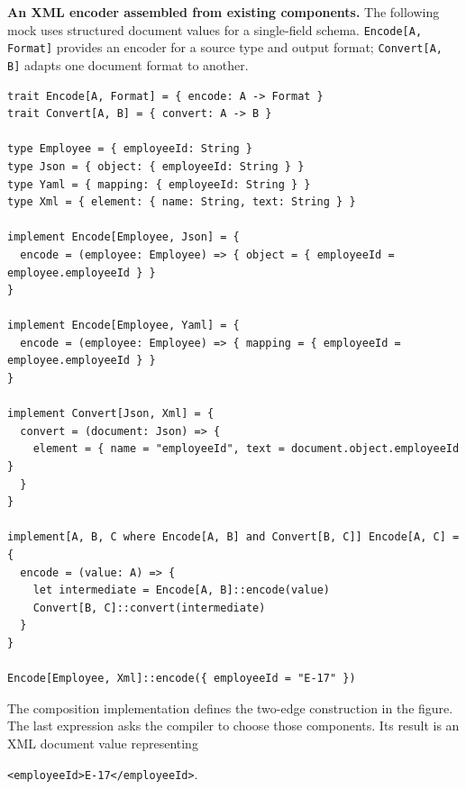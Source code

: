 \documentclass[10pt,a4paper]{article}
\begin{document}
\textbf{An XML encoder assembled from existing components.}
The following mock uses structured document values for a single-field schema.
\texttt{Encode[A, Format]} provides an encoder for a source type and output format;
\texttt{Convert[A, B]} adapts one document format to another.
\begin{lstlisting}
trait Encode[A, Format] = { encode: A -> Format }
trait Convert[A, B] = { convert: A -> B }

type Employee = { employeeId: String }
type Json = { object: { employeeId: String } }
type Yaml = { mapping: { employeeId: String } }
type Xml = { element: { name: String, text: String } }

implement Encode[Employee, Json] = {
  encode = (employee: Employee) => { object = { employeeId = employee.employeeId } }
}

implement Encode[Employee, Yaml] = {
  encode = (employee: Employee) => { mapping = { employeeId = employee.employeeId } }
}

implement Convert[Json, Xml] = {
  convert = (document: Json) => {
    element = { name = "employeeId", text = document.object.employeeId }
  }
}

implement[A, B, C where Encode[A, B] and Convert[B, C]] Encode[A, C] = {
  encode = (value: A) => {
    let intermediate = Encode[A, B]::encode(value)
    Convert[B, C]::convert(intermediate)
  }
}

Encode[Employee, Xml]::encode({ employeeId = "E-17" })
\end{lstlisting}
The composition implementation defines the two-edge construction in the figure.
The last expression asks the compiler to choose those components. Its result
is an XML document value representing
\begin{center}
\texttt{<employeeId>E-17</employeeId>}.
\end{center}

\newpage
\end{document}
